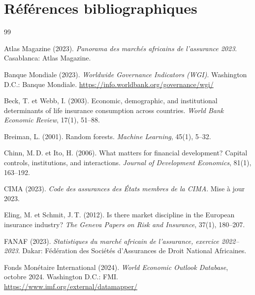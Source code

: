 \documentclass[../main.tex]{subfiles}
\begin{document}
\chapter*{Références bibliographiques}

\begin{thebibliography}{99}

Atlas Magazine (2023).
\newblock \emph{Panorama des marchés africains de l'assurance 2023}.
\newblock Casablanca: Atlas Magazine.

Banque Mondiale (2023).
\newblock \emph{Worldwide Governance Indicators (WGI)}.
\newblock Washington D.C.: Banque Mondiale.
\newblock \url{https://info.worldbank.org/governance/wgi/}

Beck, T. et Webb, I. (2003).
\newblock Economic, demographic, and institutional determinants of life insurance
  consumption across countries.
\newblock \emph{World Bank Economic Review}, 17(1), 51--88.

Breiman, L. (2001).
\newblock Random forests.
\newblock \emph{Machine Learning}, 45(1), 5--32.

Chinn, M.\,D. et Ito, H. (2006).
\newblock What matters for financial development? Capital controls, institutions,
  and interactions.
\newblock \emph{Journal of Development Economics}, 81(1), 163--192.

CIMA (2023).
\newblock \emph{Code des assurances des États membres de la CIMA}.
\newblock Mise à jour 2023.

Eling, M. et Schmit, J.\,T. (2012).
\newblock Is there market discipline in the European insurance industry?
\newblock \emph{The Geneva Papers on Risk and Insurance}, 37(1), 180--207.

FANAF (2023).
\newblock \emph{Statistiques du marché africain de l'assurance, exercice 2022--2023}.
\newblock Dakar: Fédération des Sociétés d'Assurances de Droit National Africaines.

Fonds Monétaire International (2024).
\newblock \emph{World Economic Outlook Database}, octobre 2024.
\newblock Washington D.C.: FMI.
\newblock \url{https://www.imf.org/external/datamapper/}


\end{thebibliography}
\end{document}
